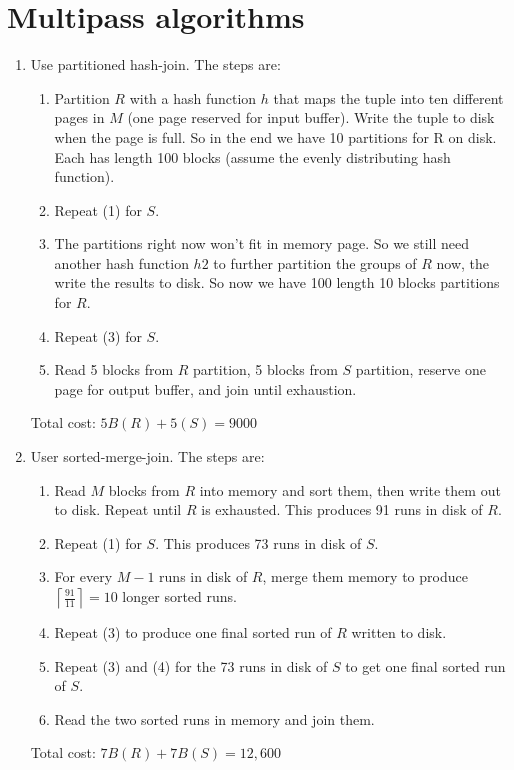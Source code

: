 \documentclass[10pt]{myland}
\begin{document}
\section{Multipass algorithms}
\begin{enumerate}[label=\textbf{\arabic*.}, listparindent=0.0em, itemsep=1em]
    \item Use partitioned hash-join. The steps are:
        \begin{enumerate}[label=\textbf{(\arabic*)}, listparindent=0.0em, itemsep=1em]
            \item Partition $R$ with a hash function $h$ that maps the tuple into ten different pages in $M$ (one page
                reserved for input buffer). Write the tuple to disk when the page is full. So in the end we have 10
                partitions for R on disk. Each has length 100 blocks (assume the evenly distributing hash function).
            \item Repeat (1) for $S$.
            \item The partitions right now won't fit in memory page. So we still need another hash function $h2$ to
                further partition the groups of $R$ now, the write the results to disk. So now we have 100 length 10 blocks
                partitions for $R$.
            \item Repeat (3) for $S$.
            \item Read 5 blocks from $R$ partition, 5 blocks from $S$ partition, reserve one page for output buffer, and
                join until exhaustion.
        \end{enumerate}
        Total cost: $5B(R) + 5(S) = 9000$
    \item User sorted-merge-join. The steps are:
        \begin{enumerate}[label=\textbf{(\arabic*)}, listparindent=0.0em, itemsep=1em]
            \item Read $M$ blocks from $R$ into memory and sort them, then write them out to disk. Repeat until $R$ is
                exhausted. This produces 91 runs in disk of $R$.
            \item Repeat (1) for $S$. This produces 73 runs in disk of $S$.
            \item For every $M - 1$ runs in disk of $R$, merge them memory to produce $\left\lceil\frac{91}{11}\right
                \rceil = 10$ longer sorted runs.
            \item Repeat (3) to produce one final sorted run of $R$ written to disk.
            \item Repeat (3) and (4) for the 73 runs in disk of $S$ to get one final sorted run of $S$.
            \item Read the two sorted runs in memory and join them.
        \end{enumerate}
        Total cost: $7B(R) + 7B(S) = 12,600$
\end{enumerate}
\end{document}
